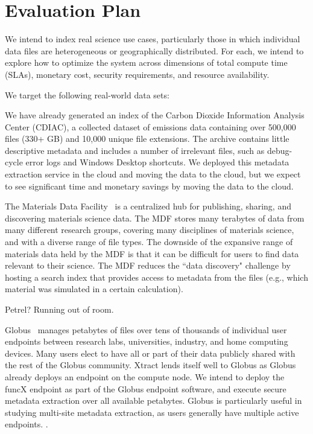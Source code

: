 \documentclass[sigconf, 9pt]{acmart}
\newcommand{\tyler}[1]{}
\newcommand{\kyle}[1]{}
\newcommand{\tyler}[1]{{\textcolor{cyan}{ tyler: #1 }}}
\newcommand{\kyle}[1]{{\textcolor{purple}{ Kyle: #1 }}}
\begin{document}
\section{Evaluation Plan}
\label{sec:eval}

We intend to index real science use cases, particularly those in which individual data files are heterogeneous 
or geographically distributed. For each, we intend to explore how to optimize the system across dimensions of 
total compute time (SLAs), monetary cost, security requirements, and resource availability.

We target the following real-world data sets: 

We have already generated an index of the Carbon Dioxide Information Analysis Center (CDIAC), a collected dataset of 
emissions data containing over 500,000 files (330+ GB) and 10,000 unique file extensions. The archive contains little 
descriptive metadata and includes a number of irrelevant files, such as debug-cycle error logs and Windows Desktop 
shortcuts.  We deployed this metadata extraction service in the cloud and moving the data to the cloud, but we expect 
to see significant time and monetary savings by moving the data to the cloud.  

The Materials Data Facility~\cite{blaiszik2016materials, blaiszik2019mdf}
is a centralized hub for publishing, sharing, and discovering materials science data. 
The MDF stores many terabytes of data from many different research groups, covering many disciplines of 
materials science, and with a diverse range of file types.
The downside of the expansive range of materials data held by the MDF 
is that it can be difficult for users to find data relevant to their science.
The MDF reduces the ``data discovery" challenge by hosting a search index that provides access to metadata from the 
files (e.g., which material was simulated in a certain calculation).

Petrel? Running out of room. 

Globus~\cite{ananthakrishnan2018globus} manages petabytes of files over tens of thousands of individual user endpoints between research labs, 
universities, industry, and home computing devices. Many \tyler{???} users elect to have all or part of their data publicly 
shared with the rest of the Globus community. \kyle{private sharing could also be indexed} Xtract lends itself well to Globus as Globus already deploys an 
endpoint on the compute node.  We intend to deploy the funcX endpoint as part of the Globus endpoint software, and 
execute secure metadata extraction over all available petabytes. Globus is particularly useful in studying multi-site 
metadata extraction, as users generally have multiple active endpoints. \tyler{more detail}. 
\end{document}
